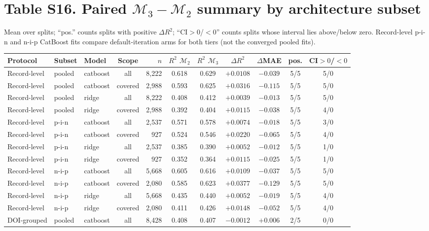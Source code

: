 \documentclass[10pt]{article}
\begin{document}
\section*{Table S16. Paired $\mathcal{M}_3-\mathcal{M}_2$ summary by architecture subset}
Mean over splits; ``pos.'' counts splits with positive $\Delta R^2$; ``CI$>0$/$<0$'' counts splits whose interval lies above/below zero. Record-level p-i-n and n-i-p CatBoost fits compare default-iteration arms for both tiers (not the converged pooled fits).\par\smallskip
{\footnotesize\begin{longtable}{lllcrcccccc}\toprule Protocol & Subset & Model & Scope & $n$ & $R^2$ $\mathcal{M}_2$ & $R^2$ $\mathcal{M}_3$ & $\Delta R^2$ & $\Delta$MAE & pos. & CI$>0$/$<0$\\\midrule\endhead
Record-level & pooled & catboost & all & 8,222 & 0.618 & 0.629 & $+0.0108$ & $-0.039$ & 5/5 & 5/0\\
Record-level & pooled & catboost & covered & 2,988 & 0.593 & 0.625 & $+0.0316$ & $-0.115$ & 5/5 & 5/0\\
Record-level & pooled & ridge & all & 8,222 & 0.408 & 0.412 & $+0.0039$ & $-0.013$ & 5/5 & 5/0\\
Record-level & pooled & ridge & covered & 2,988 & 0.392 & 0.404 & $+0.0115$ & $-0.038$ & 5/5 & 4/0\\
Record-level & p-i-n & catboost & all & 2,537 & 0.571 & 0.578 & $+0.0074$ & $-0.018$ & 5/5 & 3/0\\
Record-level & p-i-n & catboost & covered & 927 & 0.524 & 0.546 & $+0.0220$ & $-0.065$ & 5/5 & 4/0\\
Record-level & p-i-n & ridge & all & 2,537 & 0.385 & 0.390 & $+0.0052$ & $-0.012$ & 5/5 & 1/0\\
Record-level & p-i-n & ridge & covered & 927 & 0.352 & 0.364 & $+0.0115$ & $-0.025$ & 5/5 & 1/0\\
Record-level & n-i-p & catboost & all & 5,668 & 0.605 & 0.616 & $+0.0109$ & $-0.037$ & 5/5 & 5/0\\
Record-level & n-i-p & catboost & covered & 2,080 & 0.585 & 0.623 & $+0.0377$ & $-0.129$ & 5/5 & 5/0\\
Record-level & n-i-p & ridge & all & 5,668 & 0.435 & 0.440 & $+0.0052$ & $-0.019$ & 5/5 & 4/0\\
Record-level & n-i-p & ridge & covered & 2,080 & 0.411 & 0.426 & $+0.0148$ & $-0.052$ & 5/5 & 4/0\\
DOI-grouped & pooled & catboost & all & 8,428 & 0.408 & 0.407 & $-0.0012$ & $+0.006$ & 2/5 & 0/0\\

\end{longtable}}
\end{document}
